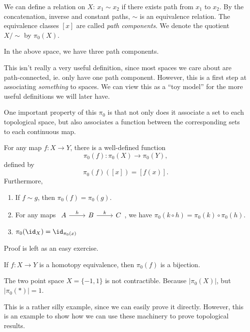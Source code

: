 \documentclass[a4paper]{article}
\begin{document}
\begin{defi}
  We can define a relation on $X$: $x_1 \sim x_2$ if there exists path from $x_1$ to $x_2$. By the concatenation, inverse and constant paths, $\sim$ is an equivalence relation. The equivalence classes $[x]$ are called \emph{path components}. We denote the quotient $X/{\sim}$ by $\pi_0(X)$.
\end{defi}
\begin{center}
\end{center}
In the above space, we have three path components.

This isn't really a very useful definition, since most spaces we care about are path-connected, ie. only have one path component. However, this is a first step at associating \emph{something} to spaces. We can view this as a ``toy model'' for the more useful definitions we will later have.

One important property of this $\pi_0$ is that not only does it associate a set to each topological space, but also associates a function between the corresponding sets to each continuous map.
\begin{prop}
  For any map $f: X\to Y$, there is a well-defined function
  \[
    \pi_0(f): \pi_0(X) \to \pi_0(Y),
  \]
  defined by
  \[
    \pi_0(f)([x]) = [f(x)].
  \]
  Furthermore,
  \begin{enumerate}
    \item If $f\sim g$, then $\pi_0(f) = \pi_0(g)$.
    \item For any maps $\begin{tikzcd} A \ar[r, "h"] & B\ar[r, "k"] & C\end{tikzcd}$, we have $\pi_0(k\circ h) = \pi_0(k)\circ \pi_0 (h)$.
    \item $\pi_0(\id_X) = \id_{\pi_0(x)}$
  \end{enumerate}
\end{prop}
Proof is left as an easy exercise.

\begin{cor}
  If $f: X\to Y$ is a homotopy equivalence, then $\pi_0(f)$ is a bijection.
\end{cor}

\begin{eg}
  The two point space $X = \{-1, 1\}$ is not contractible. Because $|\pi_0(X)|$, but $|\pi_0(*)| = 1$.
\end{eg}
This is a rather silly example, since we can easily prove it directly. However, this is an example to show how we can use these machinery to prove topological results.
\end{document}
